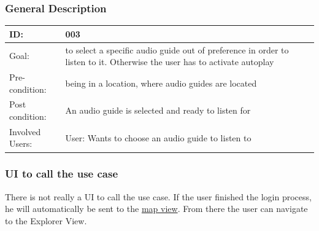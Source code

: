 \documentclass[12pt]{article}
\theoremstyle{definition}
\newenvironment{text}{
   \setlength{\parindent}{0pt}
   \color{black}
}{}
\begin{document}
    \subsubsection{General Description}
    
    \begin{tabular}{|p{.2\linewidth}|p{.65\linewidth}|}
        \hline 
        ID: & 003 \\ \hline
        Goal: & to select a specific audio guide out of preference in order to listen to it. Otherwise the user has to activate autoplay \\ \hline
        Pre-condition: & being in a location, where audio guides are located \\ \hline
        Post condition: & An audio guide is selected and ready to listen for \\ \hline
        Involved Users: & User: Wants to choose an audio guide to listen to \\ \hline
    \end{tabular}
    
    \subsubsection{UI to call the use case}
    \begin{text}
    There is not really a UI to call the use case. If the user finished the login process, he will automatically be sent to the \hyperref[fig:map_view]{map view}. From there the user can navigate to the Explorer View.  
    \end{text}
    
\end{document}
